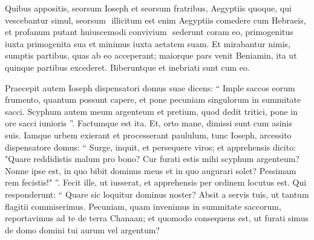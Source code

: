 \begin{biblechapter}
\begin{biblechapter}
\begin{biblechapter}
\begin{biblechapter}
\begin{biblechapter}
\begin{biblechapter}
\begin{biblechapter}
\begin{biblechapter}
\begin{biblechapter}
\begin{biblechapter}
\begin{biblechapter}
\begin{biblechapter}
\begin{biblechapter}
\begin{biblechapter}
\begin{biblechapter}
\begin{biblechapter}
\begin{biblechapter}
\begin{biblechapter}
\begin{biblechapter}
\begin{biblechapter}
\begin{biblechapter}
\begin{biblechapter}
\begin{biblechapter}
\begin{biblechapter}
\begin{biblechapter}
\begin{biblechapter}
\begin{biblechapter}
\begin{biblechapter}
\begin{biblechapter}
\begin{biblechapter}
\begin{biblechapter}
\begin{biblechapter}
\begin{biblechapter}
\begin{biblechapter}
\begin{biblechapter}
\begin{biblechapter}
\begin{biblechapter}
\begin{biblechapter}
\begin{biblechapter}
\begin{biblechapter}
\begin{biblechapter}
\begin{biblechapter}
\begin{biblechapter}
\verse Quibus appositis, seorsum Ioseph et seorsum fratribus, Aegyptiis quoque, qui vescebantur simul, seorsum ­ illicitum est enim Aegyptiis comedere cum Hebraeis, et profanum putant huiuscemodi convivium ­
 \verse sederunt coram eo, primogenitus iuxta primogenita sua et minimus iuxta aetatem suam. Et mirabantur nimis, 
\verse sumptis partibus, quas ab eo acceperant; maiorque pars venit Beniamin, ita ut quinque partibus excederet. Biberuntque et inebriati sunt cum eo.
 
\begin{biblechapter}
\verse Praecepit autem Ioseph dispensatori domus suae dicens: “ Imple saccos eorum frumento, quantum possunt capere, et pone pecuniam singulorum in summitate sacci. 
\verse Scyphum autem meum argenteum et pretium, quod dedit tritici, pone in ore sacci iunioris ”. Factumque est ita.
 \verse Et, orto mane, dimissi sunt cum asinis suis. 
\verse Iamque urbem exierant et processerant paululum, tunc Ioseph, arcessito dispensatore domus: “ Surge, inquit, et persequere viros; et apprehensis dicito: "Quare reddidistis malum pro bono? Cur furati estis mihi scyphum argenteum? 
\verse Nonne ipse est, in quo bibit dominus meus et in quo augurari solet? Pessimam rem fecistis!" ”.
 \verse Fecit ille, ut iusserat, et apprehensis per ordinem locutus est. 
\verse Qui responderunt: “ Quare sic loquitur dominus noster? Absit a servis tuis, ut tantum flagitii commiserimus. 
\verse Pecuniam, quam invenimus in summitate saccorum, reportavimus ad te de terra Chanaan; et quomodo consequens est, ut furati simus de domo domini tui aurum vel argentum? 

\end{biblechapter}
\end{biblechapter}
\end{biblechapter}
\end{biblechapter}
\end{biblechapter}
\end{biblechapter}
\end{biblechapter}
\end{biblechapter}
\end{biblechapter}
\end{biblechapter}
\end{biblechapter}
\end{biblechapter}
\end{biblechapter}
\end{biblechapter}
\end{biblechapter}
\end{biblechapter}
\end{biblechapter}
\end{biblechapter}
\end{biblechapter}
\end{biblechapter}
\end{biblechapter}
\end{biblechapter}
\end{biblechapter}
\end{biblechapter}
\end{biblechapter}
\end{biblechapter}
\end{biblechapter}
\end{biblechapter}
\end{biblechapter}
\end{biblechapter}
\end{biblechapter}
\end{biblechapter}
\end{biblechapter}
\end{biblechapter}
\end{biblechapter}
\end{biblechapter}
\end{biblechapter}
\end{biblechapter}
\end{biblechapter}
\end{biblechapter}
\end{biblechapter}
\end{biblechapter}
\end{biblechapter}
\end{biblechapter}
